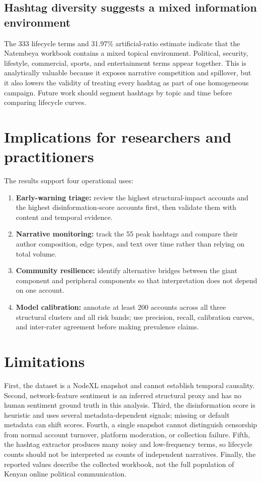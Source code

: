 \documentclass[11pt]{article}
\begin{document}
\subsection{Hashtag diversity suggests a mixed information environment}
The 333 lifecycle terms and 31.97\% artificial-ratio estimate indicate that the Natembeya workbook contains a mixed topical environment. Political, security, lifestyle, commercial, sports, and entertainment terms appear together. This is analytically valuable because it exposes narrative competition and spillover, but it also lowers the validity of treating every hashtag as part of one homogeneous campaign. Future work should segment hashtags by topic and time before comparing lifecycle curves.

\section{Implications for researchers and practitioners}

The results support four operational uses:
\begin{enumerate}
  \item \textbf{Early-warning triage:} review the highest structural-impact accounts and the highest disinformation-score accounts first, then validate them with content and temporal evidence.
  \item \textbf{Narrative monitoring:} track the 55 peak hashtags and compare their author composition, edge types, and text over time rather than relying on total volume.
  \item \textbf{Community resilience:} identify alternative bridges between the giant component and peripheral components so that interpretation does not depend on one account.
  \item \textbf{Model calibration:} annotate at least 200 accounts across all three structural clusters and all risk bands; use precision, recall, calibration curves, and inter-rater agreement before making prevalence claims.
\end{enumerate}

\section{Limitations}

First, the dataset is a NodeXL snapshot and cannot establish temporal causality. Second, network-feature sentiment is an inferred structural proxy and has no human sentiment ground truth in this analysis. Third, the disinformation score is heuristic and uses several metadata-dependent signals; missing or default metadata can shift scores. Fourth, a single snapshot cannot distinguish censorship from normal account turnover, platform moderation, or collection failure. Fifth, the hashtag extractor produces many noisy and low-frequency terms, so lifecycle counts should not be interpreted as counts of independent narratives. Finally, the reported values describe the collected workbook, not the full population of Kenyan online political communication.
\end{document}
